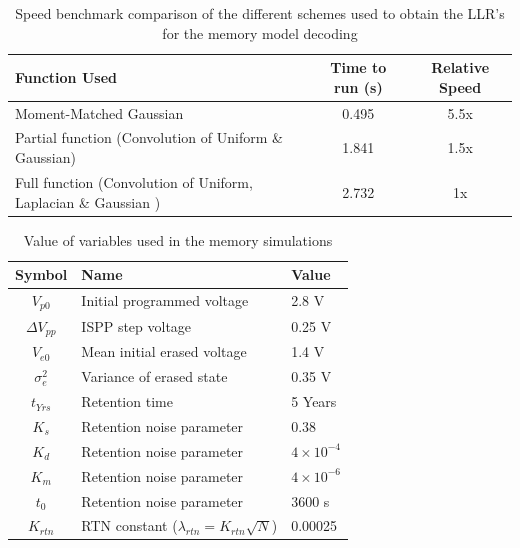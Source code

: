 \documentclass[11pt]{article}
\numberwithin{equation}{subsection}
\begin{document}
\begin{table}[ht]
\caption{Speed benchmark comparison of the different schemes used to obtain the LLR's for the memory model decoding}
\centering
\begin{tabular}{| l | c | c |}
\hline
Function Used & Time to run (s) & Relative Speed \\
\hline
Moment-Matched Gaussian & 0.495 & 5.5x \\
Partial function (Convolution of Uniform \& Gaussian) & 1.841 & 1.5x \\
Full function (Convolution of Uniform, Laplacian \& Gaussian \cite{hachem}) & 2.732 & 1x \\
\hline
\end{tabular}
\end{table}

\begin{table}[ht]
\caption{Value of variables used in the memory simulations}
\centering
\begin{tabular}{| c | l | l |}
\hline
Symbol & Name & Value \\
\hline
$V_{p0}$ & Initial programmed voltage & 2.8 V  \\
$\Delta V_{pp}$ & ISPP step voltage & 0.25 V  \\
$V_{e0}$ & Mean initial erased voltage & 1.4 V \\
$\sigma^2_e$ & Variance of erased state & 0.35 V \\
$t_{Yrs}$ & Retention time & 5 Years \\
$K_s$ & Retention noise parameter & 0.38 \\
$K_d$ & Retention noise parameter & $4\times 10^{-4}$ \\
$K_m$ & Retention noise parameter & $4\times 10^{-6}$ \\
$t_0$ & Retention noise parameter & 3600 s\\
$K_{rtn}$ & RTN constant ($\lambda_{rtn} = K_{rtn} \sqrt{N}$) & 0.00025 \\
\hline
\end{tabular}
\end{table}

\doublespacing
\printbibliography


\end{document}
